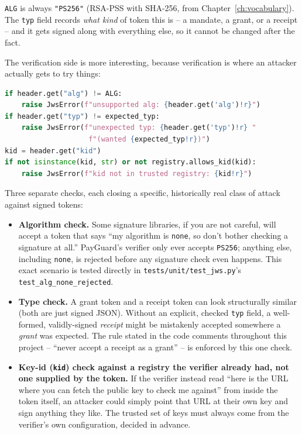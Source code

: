 \documentclass[11pt]{report}
\newcommand{\file}[1]{\texttt{#1}}
\newcommand{\code}[1]{\texttt{#1}}
\begin{document}
\code{ALG} is always \code{"PS256"} (RSA-PSS with SHA-256, from
Chapter~\ref{ch:vocabulary}). The \code{typ} field records \emph{what
kind} of token this is -- a mandate, a grant, or a receipt -- and it gets
signed along with everything else, so it cannot be changed after the
fact.

The verification side is more interesting, because verification is where
an attacker actually gets to try things:

\begin{lstlisting}[language=Python]
if header.get("alg") != ALG:
    raise JwsError(f"unsupported alg: {header.get('alg')!r}")
if header.get("typ") != expected_typ:
    raise JwsError(f"unexpected typ: {header.get('typ')!r} "
                    f"(wanted {expected_typ!r})")
kid = header.get("kid")
if not isinstance(kid, str) or not registry.allows_kid(kid):
    raise JwsError(f"kid not in trusted registry: {kid!r}")
\end{lstlisting}

Three separate checks, each closing a specific, historically real class of
attack against signed tokens:

\begin{itemize}[leftmargin=2em]
  \item \textbf{Algorithm check.} Some signature libraries, if you are not
        careful, will accept a token that says ``my algorithm is
        \code{none}, so don't bother checking a signature at all.''
        PayGuard's verifier only ever accepts \code{PS256}; anything else,
        including \code{none}, is rejected before any signature check even
        happens. This exact scenario is tested directly in
        \file{tests/unit/test\_jws.py}'s \code{test\_alg\_none\_rejected}.
  \item \textbf{Type check.} A grant token and a receipt token can look
        structurally similar (both are just signed JSON). Without an
        explicit, checked \code{typ} field, a well-formed, validly-signed
        \emph{receipt} might be mistakenly accepted somewhere a
        \emph{grant} was expected. The rule stated in the code comments
        throughout this project -- ``never accept a receipt as a grant''
        -- is enforced by this one check.
  \item \textbf{Key-id (\code{kid}) check against a registry the verifier
        already had, not one supplied by the token.} If the verifier
        instead read ``here is the URL where you can fetch the public key
        to check me against'' from inside the token itself, an attacker
        could simply point that URL at their own key and sign anything
        they like. The trusted set of keys must always come from the
        verifier's own configuration, decided in advance.
\end{itemize}
\end{document}
